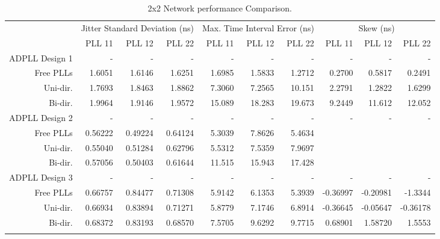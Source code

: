\begin{table}[!ht]
    \begin{center}
        \begin{footnotesize}
            \setlength{\tabcolsep}{.9\tabcolsep}
            \begin{tabular}{ll|r|r|r|r|r|r|r|r|r|}           
                \cline{3-11}
                && \multicolumn{3}{c|}{Jitter Standard Deviation (ns)} & \multicolumn{3}{c|}{Max. Time Interval Error (ns)} & \multicolumn{3}{c|}{Skew (ns)} \T\\
                \cline{3-11} 
                &&PLL 11&PLL 12&PLL 22    &PLL 11&PLL 12&PLL 22    &PLL 11&PLL 12&PLL 22\T\\
                \hline
                \multicolumn{2}{|l|}{\ac{ADPLL} Design 1}&-&-&-&-&-&-&-&-&-\T\\
                \multicolumn{2}{|r|}{Free PLLs} &1.6051  &1.6146  &1.6251     &1.6985 &1.5833 &1.2712    &0.2700 &0.5817 &0.2491 \T\\
                \multicolumn{2}{|r|}{Uni-dir.}  &1.7693  &1.8463  &1.8862     &7.3060 &7.2565 &10.151    &2.2791 &1.2822 &1.6299 \T\\
                \multicolumn{2}{|r|}{Bi-dir.}   &1.9964  &1.9146  &1.9572     &15.089 &18.283 &19.673    &9.2449 &11.612 &12.052 \T\\
                \hline
                \multicolumn{2}{|l|}{\ac{ADPLL} Design 2}&-&-&-&-&-&-&-&-&-\T\\
                \multicolumn{2}{|r|}{Free PLLs} &0.56222 &0.49224 &0.64124    &5.3039 &7.8626 &5.4634    &&& \T\\
                \multicolumn{2}{|r|}{Uni-dir.}  &0.55040 &0.51284 &0.62796    &5.5312 &7.5359 &7.9697    &&& \T\\
                \multicolumn{2}{|r|}{Bi-dir.}   &0.57056 &0.50403 &0.61644    &11.515 &15.943 &17.428    &&& \T\\
                \hline
                \multicolumn{2}{|l|}{\ac{ADPLL} Design 3}&-&-&-&-&-&-&-&-&-\T\\
                \multicolumn{2}{|r|}{Free PLLs} &0.66757 &0.84477 &0.71308    &5.9142 &6.1353 &5.3939    &-0.36997 &-0.20981 &-1.3344  \T\\
                \multicolumn{2}{|r|}{Uni-dir.}  &0.66934 &0.83894 &0.71271    &5.8779 &7.1746 &6.8914    &-0.36645 &-0.05647 &-0.36178 \T\\
                \multicolumn{2}{|r|}{Bi-dir.}   &0.68372 &0.83193 &0.68570    &7.5705 &9.6292 &9.7715    & 0.68901 & 1.58720 & 1.5553  \T\\
                \hline
                \B                
            \end{tabular}
        \end{footnotesize}
        \caption{2x2 Network performance Comparison.}
        \label{table:2x2perf}
    \end{center}
    \vspace{-0.5cm}
\end{table}
